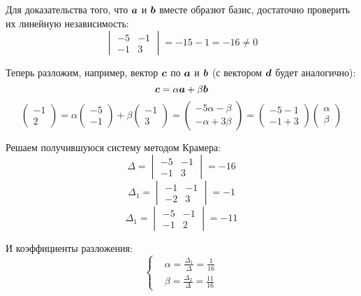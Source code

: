 \documentclass[a4paper,12pt]{article}
\begin{document}
  \begin{solution}
    Для доказательства того, что $\boldsymbol a$ и $\boldsymbol b$ вместе образют базис, достаточно проверить их линейную независимость:
    \[
      \begin{vmatrix}
        -5 & -1\\
        -1 & 3
      \end{vmatrix}
      = -15 - 1
      = -16
      \not= 0
    \]
    
    Теперь разложим, например, вектор $\boldsymbol c$ по $\boldsymbol a$ и $\boldsymbol b$ (с вектором $\boldsymbol d$ будет аналогично):
    \[
      \boldsymbol c = \alpha \boldsymbol a + \beta \boldsymbol b
    \]
    \[
      \begin{pmatrix}
        -1 \\ 2
      \end{pmatrix}
      = \alpha \begin{pmatrix}
          -5 \\ -1
        \end{pmatrix}
        + \beta \begin{pmatrix}
          -1 \\ 3
        \end{pmatrix}
      = \begin{pmatrix}
          -5\alpha - \beta\\
          -\alpha + 3\beta
        \end{pmatrix}
      = \begin{pmatrix}
          -5 -1\\
          -1 + 3
        \end{pmatrix}
        \begin{pmatrix}
          \alpha \\ \beta
        \end{pmatrix}
    \]
    
    Решаем получившуюся систему методом Крамера:
    \[
      \Delta = \begin{vmatrix}
        -5 & -1\\
        -1 & 3
      \end{vmatrix} = -16
    \]
    \[
      \Delta_1 = \begin{vmatrix}
        -1 & -1\\
        -2 & 3
      \end{vmatrix} = -1
    \]
    \[
      \Delta_1 = \begin{vmatrix}
        -5 & -1\\
        -1 & 2
      \end{vmatrix} = -11
    \]
    
    И коэффициенты разложения:
    \[
      \left\{
        \begin{aligned}
          &\alpha = \frac{\Delta_1}{\Delta} = \frac{1}{16}\\
          &\beta = \frac{\Delta_2}{\Delta} = \frac{11}{16}
        \end{aligned}
      \right.
    \]
  \end{solution}
  
\end{document}
